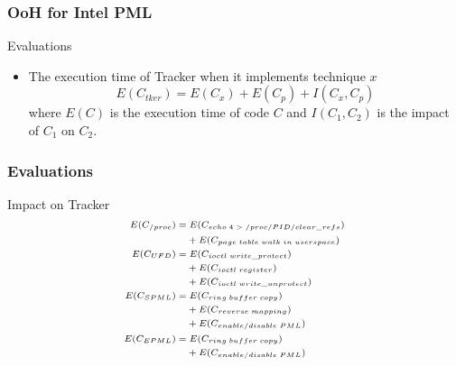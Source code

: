 \documentclass[xcolor=table,bigger,unknownkeysallowed]{beamer}
\begin{document}
        \begin{frame}
                \frametitle{OoH for Intel PML}			
			\begin{block}{Evaluations}
				\begin{itemize}
					\item The execution time of Tracker when it implements technique $x$
	\begin{equation}
		E(C_{tker}) = E(C_{x}) + E(C_{p}) + I(C_{x},C_{p})
		\label{eq:formula-generic}
	\end{equation}
	where $E(C)$ is the execution time of code $C$ and $I(C_1,C_2)$ is the impact of $C_1$ on $C_2$.
				\end{itemize}
			\end{block} 
        \end{frame}                                                                              
        \begin{frame}
                \frametitle{Evaluations}
				\begin{block}{Impact on Tracker}
	\begin{equation}\scriptsize
		\begin{split}
			E(C_{/proc}) = & \; E(C_{echo \; 4 \; > \; /proc/PID/clear\_refs}) \\
						& + E(C_{page \; table \; walk \; in \; userspace}) \\
			E(C_{UFD}) = & \; E(C_{ioctl \; write\_protect}) \\
						& + E(C_{ioctl \; register}) \\
						& + E(C_{ioctl \; write\_unprotect}) \\
			E(C_{SPML}) = & \; E(C_{ring \; buffer \; copy}) \\
						& + E(C_{reverse \; mapping}) \\
						& + E(C_{enable/disable \; PML}) \\
			E(C_{EPML}) = & \; E(C_{ring \; buffer \; copy}) \\
						& + E(C_{enable/disable \; PML})
		\end{split}
		\label{eq:formula-detailed}
	\end{equation}								
			\end{block}
        \end{frame}
\end{document}
